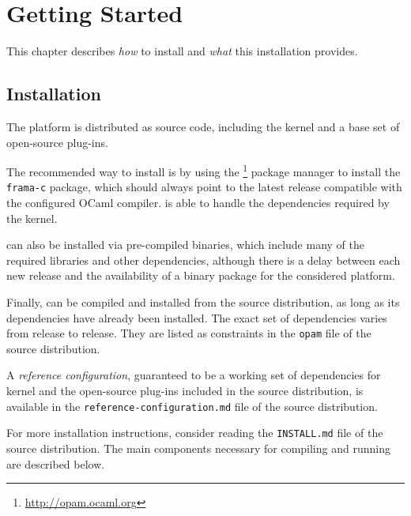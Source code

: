 \chapter{Getting Started}
\label{user-start}

This chapter describes \emph{how} to install \FramaC and
\emph{what} this installation provides.

\section{Installation}\label{sec:install}

The \FramaC platform is distributed as source code, including the \FramaC kernel
and a base set of open-source plug-ins.

The recommended way to install \FramaC is by using the
\opam{}\footnote{\url{http://opam.ocaml.org}} package manager to
install the \texttt{frama-c} package, which should always point to the latest
release compatible with the configured OCaml compiler. \opam is able to handle
the dependencies required by the \FramaC kernel.

\FramaC can also be installed via pre-compiled binaries,
which include many of the required libraries and other dependencies, although
there is a delay between each new \FramaC release and the availability of a
binary package for the considered platform.

Finally, \FramaC can be compiled and installed from the source distribution,
as long as its dependencies have already been installed. The exact set of
dependencies varies from release to release. They are listed as constraints
in the \texttt{opam} file of the source distribution.

A {\em reference configuration}, guaranteed to be a working set of dependencies
for \FramaC kernel and the open-source plug-ins included in the source
distribution, is available in the \texttt{reference-configuration.md} file of
the source distribution.

For more installation instructions, consider reading the \texttt{INSTALL.md}
file of the source distribution. The main components necessary for compiling
and running \FramaC are described below.

